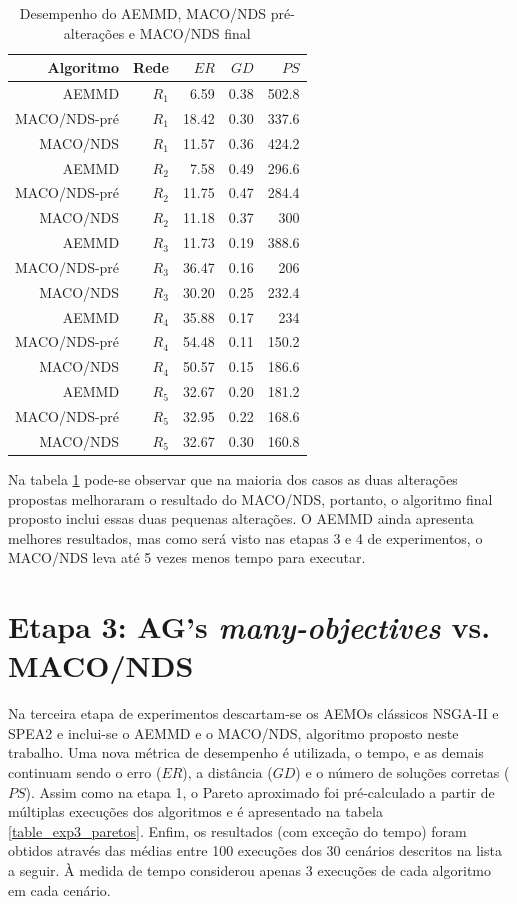 \begin{table}[!htbp]
	\centering
	\caption{Desempenho do AEMMD, MACO/NDS pré-alterações e MACO/NDS final}
	\label{tab_exp2_macod_simples}
	\begin{tabular}{rrrrr}
		Algoritmo  & Rede  & $ER$  & $GD$ & $PS$  \\ \hline
		AEMMD      & $R_1$ & 6.59  & 0.38 & 502.8 \\
		MACO/NDS-pré & $R_1$ & 18.42 & 0.30 & 337.6 \\
		MACO/NDS     & $R_1$ & 11.57 & 0.36 & 424.2 \\ \hline
		AEMMD      & $R_2$ & 7.58  & 0.49 & 296.6 \\
		MACO/NDS-pré & $R_2$ & 11.75 & 0.47 & 284.4 \\
		MACO/NDS     & $R_2$ & 11.18 & 0.37 & 300   \\ \hline
		AEMMD      & $R_3$ & 11.73 & 0.19 & 388.6 \\
		MACO/NDS-pré & $R_3$ & 36.47 & 0.16 & 206   \\
		MACO/NDS     & $R_3$ & 30.20 & 0.25 & 232.4 \\ \hline
		AEMMD      & $R_4$ & 35.88 & 0.17 & 234   \\
		MACO/NDS-pré & $R_4$ & 54.48 & 0.11 & 150.2 \\
		MACO/NDS     & $R_4$ & 50.57 & 0.15 & 186.6 \\ \hline
		AEMMD      & $R_5$ & 32.67 & 0.20 & 181.2 \\
		MACO/NDS-pré & $R_5$ & 32.95 & 0.22 & 168.6 \\
		MACO/NDS     & $R_5$ & 32.67 & 0.30 & 160.8
	\end{tabular}
\end{table}

Na tabela \ref{tab_exp2_macod_simples} pode-se observar que na maioria dos casos as duas alterações propostas melhoraram o resultado do MACO/NDS, portanto, o algoritmo final proposto inclui essas duas pequenas alterações. O AEMMD ainda apresenta melhores resultados, mas como será visto nas etapas 3 e 4 de experimentos, o MACO/NDS leva até 5 vezes menos tempo para executar.

\section{Etapa 3: AG's \textit{many-objectives} vs. MACO/NDS}
\label{section_experimentos_etapa3}

Na terceira etapa de experimentos descartam-se os AEMOs clássicos NSGA-II e SPEA2 e inclui-se o AEMMD e o MACO/NDS, algoritmo proposto neste trabalho. Uma nova métrica de desempenho é utilizada, o tempo, e as demais continuam sendo o erro ($ER$), a distância ($GD$) e o número de soluções corretas ($PS$). Assim como na etapa 1, o Pareto aproximado foi pré-calculado a partir de múltiplas execuções dos algoritmos e é apresentado na tabela \ref{table_exp3_paretos}. Enfim, os resultados (com exceção do tempo) foram obtidos através das médias entre 100 execuções dos 30 cenários descritos na lista a seguir. À medida de tempo considerou apenas 3 execuções de cada algoritmo em cada cenário.


